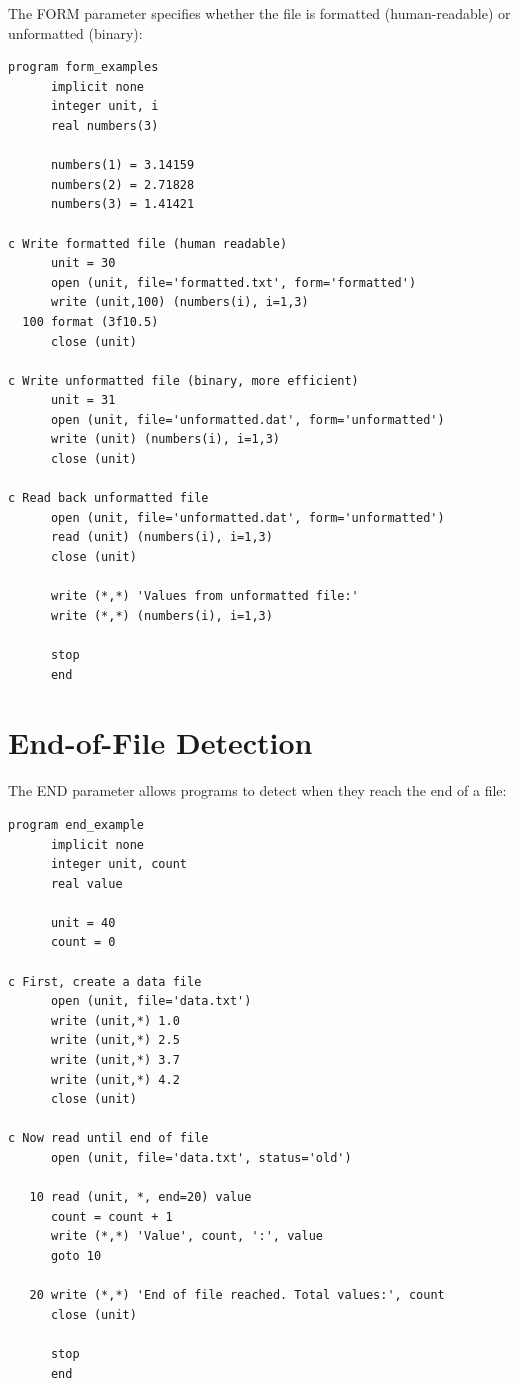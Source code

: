 The FORM parameter specifies whether the file is formatted (human-readable) or unformatted (binary):

\begin{lstlisting}[style=fortran77]
      program form_examples
      implicit none
      integer unit, i
      real numbers(3)
      
      numbers(1) = 3.14159
      numbers(2) = 2.71828
      numbers(3) = 1.41421
      
c Write formatted file (human readable)
      unit = 30
      open (unit, file='formatted.txt', form='formatted')
      write (unit,100) (numbers(i), i=1,3)
  100 format (3f10.5)
      close (unit)
      
c Write unformatted file (binary, more efficient)
      unit = 31
      open (unit, file='unformatted.dat', form='unformatted')
      write (unit) (numbers(i), i=1,3)
      close (unit)
      
c Read back unformatted file
      open (unit, file='unformatted.dat', form='unformatted')
      read (unit) (numbers(i), i=1,3)
      close (unit)
      
      write (*,*) 'Values from unformatted file:'
      write (*,*) (numbers(i), i=1,3)
      
      stop
      end
\end{lstlisting}

\section{End-of-File Detection}

The END parameter allows programs to detect when they reach the end of a file:

\begin{lstlisting}[style=fortran77]
      program end_example
      implicit none
      integer unit, count
      real value
      
      unit = 40
      count = 0
      
c First, create a data file
      open (unit, file='data.txt')
      write (unit,*) 1.0
      write (unit,*) 2.5
      write (unit,*) 3.7
      write (unit,*) 4.2
      close (unit)
      
c Now read until end of file
      open (unit, file='data.txt', status='old')
      
   10 read (unit, *, end=20) value
      count = count + 1
      write (*,*) 'Value', count, ':', value
      goto 10
      
   20 write (*,*) 'End of file reached. Total values:', count
      close (unit)
      
      stop
      end
\end{lstlisting}

